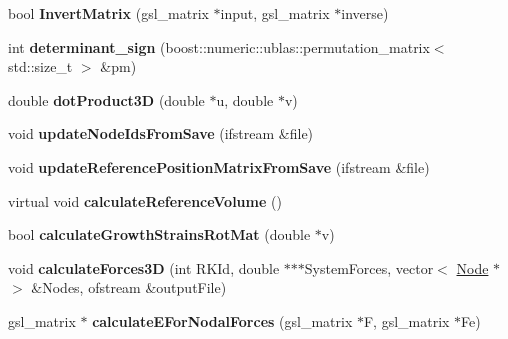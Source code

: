 \begin{DoxyCompactItemize}
\item 
\hypertarget{classShapeBase_ab0a890c07a2fa8ac45fa50bdbfe6b0d9}{}bool {\bfseries Invert\+Matrix} (gsl\+\_\+matrix $\ast$input, gsl\+\_\+matrix $\ast$inverse)\label{classShapeBase_ab0a890c07a2fa8ac45fa50bdbfe6b0d9}

\item 
\hypertarget{classShapeBase_a82fc62813dedf48bf3074206a26c3dfd}{}int {\bfseries determinant\+\_\+sign} (boost\+::numeric\+::ublas\+::permutation\+\_\+matrix$<$ std\+::size\+\_\+t $>$ \&pm)\label{classShapeBase_a82fc62813dedf48bf3074206a26c3dfd}

\item 
\hypertarget{classShapeBase_a6b58642f88a23bd984d7af48cbd4f95a}{}double {\bfseries dot\+Product3\+D} (double $\ast$u, double $\ast$v)\label{classShapeBase_a6b58642f88a23bd984d7af48cbd4f95a}

\item 
\hypertarget{classShapeBase_ac4c46ba7c9b89a208fafb419097494a5}{}void {\bfseries update\+Node\+Ids\+From\+Save} (ifstream \&file)\label{classShapeBase_ac4c46ba7c9b89a208fafb419097494a5}

\item 
\hypertarget{classShapeBase_a4b5cade90773535353e9b7c4da3463ae}{}void {\bfseries update\+Reference\+Position\+Matrix\+From\+Save} (ifstream \&file)\label{classShapeBase_a4b5cade90773535353e9b7c4da3463ae}

\item 
\hypertarget{classShapeBase_a39adc8589779388b57622489f370f445}{}virtual void {\bfseries calculate\+Reference\+Volume} ()\label{classShapeBase_a39adc8589779388b57622489f370f445}

\item 
\hypertarget{classShapeBase_a8bf9c7c8ae6a3195ec9c6b6bdaf847ab}{}bool {\bfseries calculate\+Growth\+Strains\+Rot\+Mat} (double $\ast$v)\label{classShapeBase_a8bf9c7c8ae6a3195ec9c6b6bdaf847ab}

\item 
\hypertarget{classShapeBase_ade15b14f3439f1c9c0bcd78c2cebad61}{}void {\bfseries calculate\+Forces3\+D} (int R\+K\+Id, double $\ast$$\ast$$\ast$System\+Forces, vector$<$ \hyperlink{classNode}{Node} $\ast$ $>$ \&Nodes, ofstream \&output\+File)\label{classShapeBase_ade15b14f3439f1c9c0bcd78c2cebad61}

\item 
\hypertarget{classShapeBase_a311e773cb7bf7c410c39026d7183b4ad}{}gsl\+\_\+matrix $\ast$ {\bfseries calculate\+E\+For\+Nodal\+Forces} (gsl\+\_\+matrix $\ast$F, gsl\+\_\+matrix $\ast$Fe)\label{classShapeBase_a311e773cb7bf7c410c39026d7183b4ad}


\end{DoxyCompactItemize}
